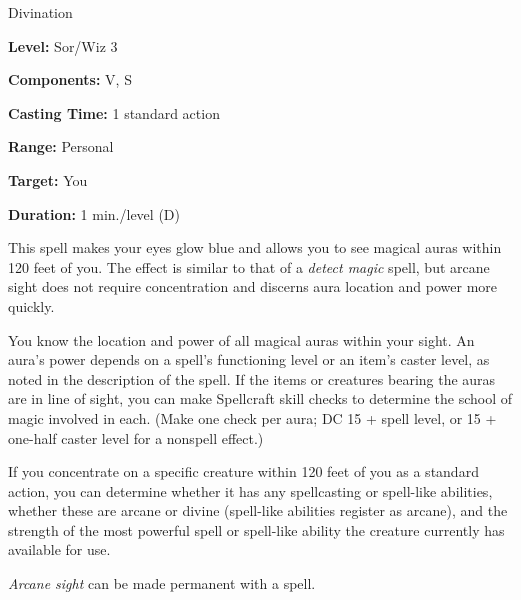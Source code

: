 
Divination

\textbf{Level:} Sor/Wiz 3

\textbf{Components:} V, S

\textbf{Casting Time:} 1 standard action

\textbf{Range:} Personal

\textbf{Target:} You

\textbf{Duration:} 1 min./level (D)

This spell makes your eyes glow blue and allows you to see magical auras within 
120 feet of you. The effect is similar to that of a \textit{detect magic} spell, 
but arcane sight does not require concentration and discerns aura location 
and power more quickly.

You know the location and power of all magical auras within your sight. An aura's 
power depends on a spell's functioning level or an item's caster level, as noted 
in the description of the  spell. If the items or creatures 
bearing the auras are in line of sight, you can make Spellcraft skill checks to 
determine the school of magic involved in each. (Make one check per aura; DC 15 
+ spell level, or 15 + one-half caster level for a nonspell effect.)

If you concentrate on a specific creature within 120 feet of you as a standard 
action, you can determine whether it has any spellcasting or spell-like abilities, 
whether these are arcane or divine (spell-like abilities register as arcane), and 
the strength of the most powerful spell or spell-like ability the creature currently 
has available for use.

\textit{Arcane sight} can be made permanent with a  spell.

